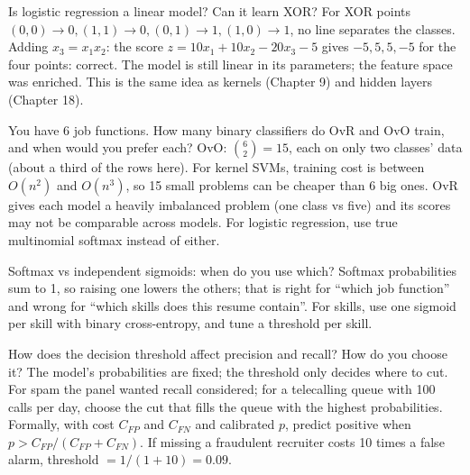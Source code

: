 \begin{qa}{\deep Is logistic regression a linear model? Can it learn XOR?}
\why For XOR points $(0,0)\to0,(1,1)\to0,(0,1)\to1,(1,0)\to1$, no line separates the classes. Adding $x_3 = x_1x_2$:
the score $z = 10x_1 + 10x_2 - 20x_3 - 5$ gives $-5, 5, 5, -5$ for the four points: correct. The model is still
linear in its parameters; the feature space was enriched. This is the same idea as kernels (Chapter 9) and hidden layers
(Chapter 18).
\end{qa}

\begin{qa}{ You have 6 job functions. How many binary classifiers do OvR and OvO
train, and when would you prefer each?}
\why OvO: $\binom62 = 15$, each on only two classes' data (about a third of the rows here). For kernel SVMs, training
cost is between $O(n^2)$ and $O(n^3)$, so 15 small problems can be cheaper than 6 big ones. OvR gives each model a
heavily imbalanced problem (one class vs five) and its scores may not be comparable across models. For logistic
regression, use true multinomial softmax instead of either.
\end{qa}

\begin{qa}{Softmax vs independent sigmoids: when do you use which?}
\why Softmax probabilities sum to 1, so raising one lowers the others; that is right for ``which job function'' and wrong
for ``which skills does this resume contain''. For skills, use one sigmoid per skill with binary cross-entropy, and
tune a threshold per skill.
\end{qa}

\begin{qa}{How does the decision threshold affect precision and recall? How do you choose it?}
\why The model's probabilities are fixed; the threshold only decides where to cut. For spam the panel wanted recall
considered; for a telecalling queue with 100 calls per day, choose the cut that fills the queue with the highest
probabilities. Formally, with cost $C_{FP}$ and $C_{FN}$ and calibrated $p$, predict positive when
$p > C_{FP}/(C_{FP} + C_{FN})$.
\worked If missing a fraudulent recruiter costs 10 times a false alarm, threshold $= 1/(1+10) = 0.09$.
\end{qa}

